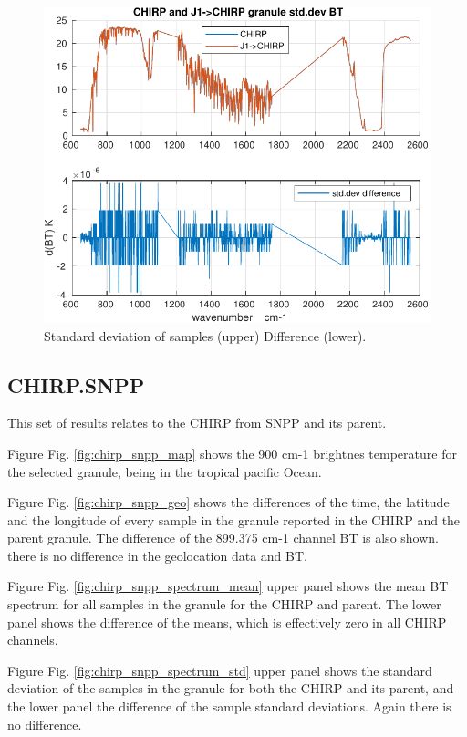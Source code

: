 \documentclass[11pt]{article}
\begin{document}
\begin{figure}[htbp]
\centering
\includegraphics[width=.9\linewidth]{./figs/2020d001g120_chirp_j1_bt_spectrum_std.pdf}
\caption{\label{fig:org44ee57e}
Standard deviation of samples (upper) Difference (lower).}
\end{figure}




\subsection{CHIRP.SNPP}
\label{sec:orgd452a14}

This set of results relates to the CHIRP from SNPP and its parent.

Figure Fig. \ref{fig:chirp_snpp_map} shows the 900 cm-1 brightnes temperature for the selected granule, being in the tropical pacific Ocean.

Figure Fig. \ref{fig:chirp_snpp_geo} shows the differences of the time, the latitude and the longitude of every sample in the granule  reported in the CHIRP and the parent granule. The difference of the 899.375 cm-1 channel BT is also shown. there is no difference in the geolocation data and BT.

Figure Fig. \ref{fig:chirp_snpp_spectrum_mean} upper panel shows the mean BT spectrum for all samples in the granule for the CHIRP and parent. The lower panel shows the difference of the means, which is effectively zero in all CHIRP channels.

Figure Fig. \ref{fig:chirp_snpp_spectrum_std} upper panel shows the standard deviation of the samples in the granule for both the CHIRP and its parent, and the lower panel the difference of the sample standard deviations. Again there is no difference.
\end{document}
